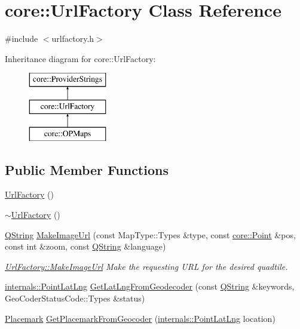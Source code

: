 \hypertarget{classcore_1_1_url_factory}{\section{core\-:\-:\-Url\-Factory \-Class \-Reference}
\label{classcore_1_1_url_factory}
}


{\ttfamily \#include $<$urlfactory.\-h$>$}

\-Inheritance diagram for core\-:\-:\-Url\-Factory\-:\begin{figure}[H]
\begin{center}
\leavevmode
\includegraphics[height=3.000000cm]{classcore_1_1_url_factory}
\end{center}
\end{figure}
\subsection*{\-Public \-Member \-Functions}
\begin{DoxyCompactItemize}
\item 
\hyperlink{group___o_p_map_widget_gabc044615454cf1ce949b090b45a3b20d}{\-Url\-Factory} ()
\item 
\hyperlink{group___o_p_map_widget_ga67b13bc9e7c21c4fcc4471ddce351805}{$\sim$\-Url\-Factory} ()
\item 
\hyperlink{group___u_a_v_objects_plugin_gab9d252f49c333c94a72f97ce3105a32d}{\-Q\-String} \hyperlink{group___o_p_map_widget_ga7339895a709cbc83dfac87ec5e1a42ff}{\-Make\-Image\-Url} (const \-Map\-Type\-::\-Types \&type, const \hyperlink{structcore_1_1_point}{core\-::\-Point} \&pos, const int \&zoom, const \hyperlink{group___u_a_v_objects_plugin_gab9d252f49c333c94a72f97ce3105a32d}{\-Q\-String} \&language)
\begin{DoxyCompactList}\small\item\em \hyperlink{group___o_p_map_widget_ga7339895a709cbc83dfac87ec5e1a42ff}{\-Url\-Factory\-::\-Make\-Image\-Url} \-Make the requesting \-U\-R\-L for the desired quadtile. \end{DoxyCompactList}\item 
\hyperlink{structinternals_1_1_point_lat_lng}{internals\-::\-Point\-Lat\-Lng} \hyperlink{group___o_p_map_widget_ga39ab1784711725813c6e90f8be8557b5}{\-Get\-Lat\-Lng\-From\-Geodecoder} (const \hyperlink{group___u_a_v_objects_plugin_gab9d252f49c333c94a72f97ce3105a32d}{\-Q\-String} \&keywords, \-Geo\-Coder\-Status\-Code\-::\-Types \&status)
\item 
\hyperlink{classcore_1_1_placemark}{\-Placemark} \hyperlink{group___o_p_map_widget_ga3490a9f0d7fad2058ec2e9a04e7c7f4e}{\-Get\-Placemark\-From\-Geocoder} (\hyperlink{structinternals_1_1_point_lat_lng}{internals\-::\-Point\-Lat\-Lng} location)
\end{DoxyCompactItemize}
